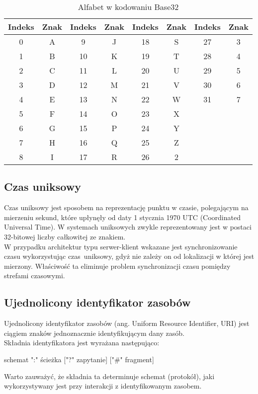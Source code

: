 \begin{table}[h!]
\centering
\caption{Alfabet w kodowaniu Base32}
\begin{tabular}{ |c c|c c|c c|c c| } 
 \hline
 Indeks & Znak & Indeks & Znak & Indeks & Znak & Indeks & Znak \\ 
 \hline
 0 & A & 9  & J & 18 & S & 27 & 3 \\ 
 1 & B & 10 & K & 19 & T & 28 & 4 \\ 
 2 & C & 11 & L & 20 & U & 29 & 5 \\ 
 3 & D & 12 & M & 21 & V & 30 & 6 \\ 
 4 & E & 13 & N & 22 & W & 31 & 7 \\ 
 5 & F & 14 & O & 23 & X &    &   \\ 
 6 & G & 15 & P & 24 & Y &    &   \\  
 7 & H & 16 & Q & 25 & Z &    &   \\ 
 8 & I & 17 & R & 26 & 2 &    &   \\ 
 \hline
\end{tabular}
\end{table}

\subsection{Czas uniksowy}
Czas uniksowy jest sposobem na reprezentację punktu w czasie, polegającym na mierzeniu sekund, które
upłynęły od daty 1 stycznia 1970 UTC (Coordinated Universal Time). W systemach uniksowych zwykle reprezentowany jest w postaci
32-bitowej liczby całkowitej ze znakiem. \\
W przypadku architektur typu serwer-klient wskazane jest synchronizowanie czasu wykorzystując czas~uniksowy,
gdyż nie zależy on od lokalizacji w której jest mierzony. Właściwość ta eliminuje problem synchronizacji 
czasu pomiędzy strefami czasowymi.

\subsection{Ujednolicony identyfikator zasobów}
Ujednolicony identyfikator zasobów (ang. Uniform Resource Identifier, URI) jest ciągiem znaków jednoznacznie identyfikującym dany zasób. \\
Składnia identyfikatora jest wyrażana następująco: \\
\centerline{schemat ":" ścieżka ["?" zapytanie] ["\#" fragment]} 
Warto zauważyć, że składnia ta determinuje schemat (protokół), jaki wykorzystywany jest przy interakcji z identyfikowanym zasobem. \\

